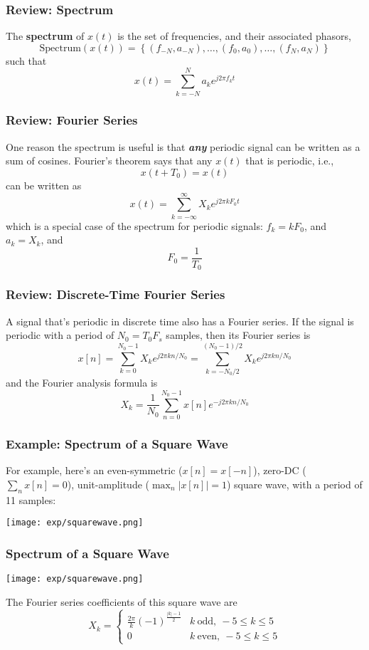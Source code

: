 \documentclass{beamer}
\begin{document}
\begin{frame}
  \frametitle{Review: Spectrum}

  The {\bf spectrum} of $x(t)$ is the set of frequencies, and their
  associated phasors,
  \[
  \mbox{Spectrum}\left( x(t) \right) =
  \left\{ (f_{-N},a_{-N}), \ldots, (f_0,a_0), \ldots, (f_N,a_N) \right\}
  \]
  such that
  \[
  x(t) = \sum_{k=-N}^N a_ke^{j2\pi f_kt}
  \]
\end{frame}

\begin{frame}
  \frametitle{Review: Fourier Series}

  One reason the spectrum is useful is that {\bf\em any} periodic
  signal can be written as a sum of cosines.  Fourier's theorem says that
  any $x(t)$ that is periodic, i.e.,
  \[
  x(t+T_0) = x(t)
  \]
  can be written as
  \[
  x(t) = \sum_{k=-\infty}^\infty X_k e^{j2\pi k F_0 t}
  \]
  which is a special case of the spectrum for periodic signals:
  $f_k=kF_0$, and $a_k=X_k$, and
  \[
  F_0 = \frac{1}{T_0}
  \]
\end{frame}

\begin{frame}
  \frametitle{Review: Discrete-Time Fourier Series}

  A signal that's periodic in discrete time also has a Fourier series.
  If the signal is periodic with a period of $N_0=T_0F_s$ samples,
  then its Fourier series is
  \[
  x[n] = \sum_{k=0}^{N_0-1} X_k e^{j2\pi kn/N_0} =\sum_{k=-N_0/2}^{(N_0-1)/2} X_k e^{j2\pi kn/N_0}
  \]
  and the Fourier analysis formula is
  \[
  X_k = \frac{1}{N_0}\sum_{n=0}^{N_0-1} x[n]e^{-j2\pi kn/N_0}  
  \]
\end{frame}

\begin{frame}
  \frametitle{Example: Spectrum of a Square Wave}

  For example, here's an even-symmetric ($x[n]=x[-n]$), zero-DC
  ($\sum_n x[n]=0$), unit-amplitude ($\max_n |x[n]|=1$) square wave,
  with a period of 11 samples:
  \centerline{\texttt{[image: exp/squarewave.png]}}
\end{frame}

\begin{frame}
  \frametitle{Spectrum of a Square Wave}

  \centerline{\texttt{[image: exp/squarewave.png]}}
  The Fourier series coefficients of this square wave are
  \[
  X_k = \begin{cases}
    \frac{2\pi}{k}(-1)^{\frac{|k|-1}{2}} & k~\mbox{odd},~-5\le k\le 5\\
    0 & k~\mbox{even},~-5\le k\le 5
  \end{cases}
  \]
\end{frame}
\end{document}
